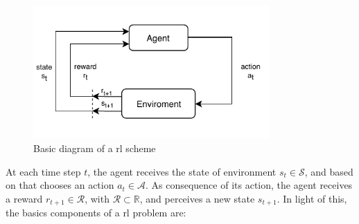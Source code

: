 \begin{figure}[htbp]
\centerline{\includegraphics[width=90mm]{figures/chp_theory/rl-model.pdf}}
\caption{Basic diagram of a \gls{rl} scheme}
\label{fig:rlbasic}
\end{figure}

At each time step $t$, the agent receives the state of environment $s_t \in \mathcal{S}$, and based on that chooses an action $a_t \in \mathcal{A}$.
%
As consequence of its action, the agent receives a reward $r_{t+1} \in \mathcal{R} $, with $\mathcal{R} \subset \mathbb{R}$, and perceives a new state $s_{t+1}$.
%
In light of this, the basics components of a \gls{rl} problem are:

